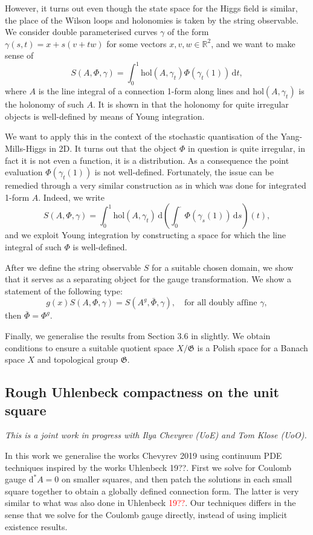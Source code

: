\documentclass[11pt]{article}
\numberwithin{equation}{section}
\theoremstyle{definition}
\theoremstyle{remark}
\newcommand{\hol}{\mathrm{hol}}
\newcommand{\diff}{\mathrm{d}}
\newcommand{\R}{\mathbb R}
\newcommand{\1}{\mathbf 1}
\newcommand{\<}{\langle}
\renewcommand{\>}{\rangle}
\newcommand{\red}[1]{\textcolor{red}{#1}}
\begin{document}
However, it turns out even though the state space for the Higgs field is similar, the place of the Wilson loops and holonomies is taken by the string observable. We consider double parameterised curves $\gamma$ of the form $\gamma(s,t)=x+s(v+tw)$ for some vectors $x,v,w\in \R^2$, and we want to make sense of
$$S(A,\Phi,\gamma)=\int^1_0 \hol(A,\gamma_t)\Phi(\gamma_t(1))\,\diff t,$$
where $A$ is the line integral of a connection 1-form along lines and $\hol(A,\gamma_t)$ is the holonomy of such $A$. It is shown in \cite{CCHS_2D_YM} that the holonomy for quite irregular objects is well-defined by means of Young integration. 

We want to apply this in the context of the stochastic quantisation of the Yang-Mills-Higgs in 2D. It turns out that the object $\Phi$ in question is quite irregular, in fact it is not even a function, it is a distribution. As a consequence the point evaluation $\Phi(\gamma_t(1))$ is not well-defined. Fortunately, the issue can be remedied through a very similar construction as in \cite{CCHS_2D_YM} which was done for integrated 1-form $A$.  Indeed, we write
$$S(A,\Phi,\gamma)=\int^1_0 \hol(A,\gamma_t)\,\diff\left( \int^\cdot_0 \Phi(\gamma_s(1))\,\diff s\right)(t),$$
and we exploit Young integration by constructing a space for which the line integral of such $\Phi$ is well-defined. 

After we define the string observable $S$ for a suitable chosen domain, we show that it serves as a separating object for the gauge transformation. We show a statement of the following type:
$$g(x)S(A,\Phi,\gamma)=S(A^g,\bar\Phi,\gamma), \  \ \ \text{ for all doubly affine }\gamma,$$
then $\bar\Phi=\Phi^g$. 

Finally, we generalise the results from Section 3.6 in \cite{CCHS_2D_YM} slightly. We obtain conditions to ensure a suitable quotient space $X/\mathfrak G$ is a Polish space for a Banach space $X$ and topological group $\mathfrak G$. 


\subsection{Rough Uhlenbeck compactness on the unit square}
\textit{This is a joint work in progress with Ilya Chevyrev (UoE) and Tom Klose (UoO).}

\medskip

\noindent In this work we generalise the works Chevyrev 2019 using continuum PDE techniques inspired by the works Uhlenbeck 19??. First we solve for Coulomb gauge $\diff^*A=0$ on smaller squares, and then patch the solutions in each small square together to obtain a globally defined connection form. The latter is very similar to what was also done in Uhlenbeck \red{19??}. Our techniques differs in the sense that we solve for the Coulomb gauge directly, instead of using implicit existence results. 
\end{document}
